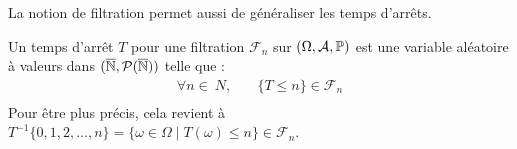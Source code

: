La notion de filtration permet aussi de généraliser les temps d'arrêts. 

\begin{definition}
    Un temps d'arrêt $T$ pour une filtration $ \mathcal{F}_n$ sur $( \Omega, \mathcal{A}, \mathbb{P})$ est une 
    variable aléatoire à valeurs dans $( \overline{\mathbb{N}}, \mathcal{P}( \overline{\mathbb{N}}))$ telle que : 
        \begin{align*}
            \forall n \in \ N, \quad  & \{T \leqslant n\} \in \mathcal{F}_n \\  
        \end{align*} 
    Pour être plus précis, cela revient à $ T^{-1} \{0, 1, 2, \dots, n\} = \{ \omega \in \Omega \mid T( \omega) \leqslant n\} \in \mathcal{F}_n$. 
\end{definition}
